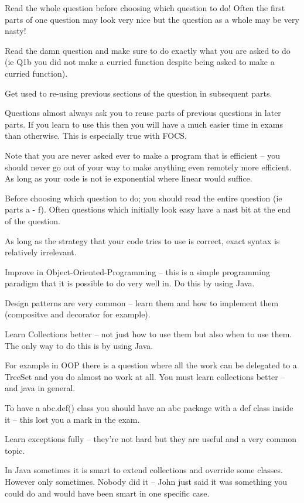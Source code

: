 \documentclass[10pt,\jkfside,a4paper]{article}
\begin{document}
Read the whole question before choosing which question to do! Often the first parts of one question may 
look very nice but the question as a whole may be very nasty!

Read the damn question and make sure to do exactly what you are asked to do (ie Q1b you did not make a 
curried function despite being asked to make a curried function).

Get used to re-using previous sections of the question in subsequent parts.

Questions almost always ask you to reuse parts of previous questions in later parts. 
If you learn to use this then you will have a much easier time in exams than otherwise. 
This is especially true with FOCS.

Note that you are never asked ever to make a program that is efficient -- you should never go out of 
your way to make anything even remotely more efficient. As long as your code is not 
ie exponential where linear would suffice.

Before choosing which question to do; you should read the entire question (ie parts a - f). Often questions which 
initially look easy have a nast bit at the end of the question.

As long as the strategy that your code tries to use is correct, exact syntax is relatively irrelevant.

Improve in Object-Oriented-Programming -- this is a simple programming paradigm that it is possible 
to do very well in. Do this by using Java.

Design patterns are very common -- learn them and how to implement them (compositve and decorator for example).

Learn Collections better -- not just how to use them but also when to use them. The only way to do this 
is by using Java.

For example in OOP there is a question where all the work can be delegated to a TreeSet and you do 
almost no work at all. You must learn collections better -- and java in general.

To have a abc.def() class you should have an abc package with a def class inside it -- this lost you a mark 
in the exam.

Learn exceptions fully -- they're not hard but they are useful and a very common topic.

In Java sometimes it is smart to extend collections and override some classes. However only sometimes. 
Nobody did it -- John just said it was something you could do and would have been smart in one specific case.
\end{document}
